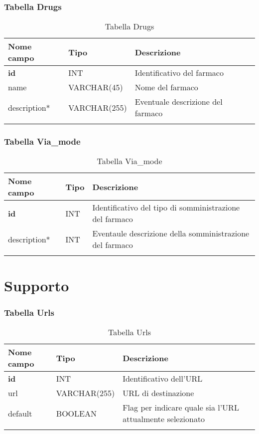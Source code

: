 \subsubsection{Tabella Drugs}

\begin{longtable}{|l|l|p{5.5cm}|}
\hline
\textbf{Nome campo} &	\textbf{Tipo} &	\textbf{Descrizione}\\ \hline
\textbf{id}	 & INT & 	Identificativo del farmaco\\ \hline
name & 	VARCHAR(45)	 & Nome del farmaco\\ \hline
description* & 	VARCHAR(255) & 	Eventuale descrizione del farmaco\\ \hline
\caption{Tabella Drugs}
\end{longtable}

\subsubsection{Tabella Via\_mode}

\begin{longtable}{|l|l|p{7.5cm}|}
\hline
\textbf{Nome campo} &	\textbf{Tipo} &	\textbf{Descrizione}\\ \hline
\textbf{id}	 & INT	 & Identificativo del tipo di somministrazione del farmaco\\ \hline
description* & 	INT & 	Eventaule descrizione della somministrazione del farmaco\\ \hline
\caption{Tabella Via\_mode}
\end{longtable}

\section{Supporto}

\subsubsection{Tabella Urls}

\begin{longtable}{|l|l|p{7.5cm}|}
\hline
\textbf{Nome campo} &	\textbf{Tipo} &	\textbf{Descrizione}\\ \hline
\textbf{id}	 & INT	 & Identificativo dell'URL\\ \hline
url & 	VARCHAR(255) & 	URL di destinazione\\ \hline
default & 	BOOLEAN & 	Flag per indicare quale sia l'URL attualmente selezionato\\ \hline
\caption{Tabella Urls}
\end{longtable}